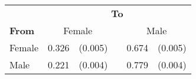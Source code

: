 
\begin{tabular}{lr@{ }r@{}cr@{ }r}
    \toprule
    & \multicolumn{5}{c}{\textbf{To}} \\
    \cmidrule(l){2-6}
    \textbf{From} & \multicolumn{2}{c}{Female} && \multicolumn{2}{c}{Male} \\
    \midrule
    Female & 0.326 & (0.005) &  & 0.674 & (0.005) \\
    Male & 0.221 & (0.004) &  & 0.779 & (0.004) \\
    \bottomrule
\end{tabular}

